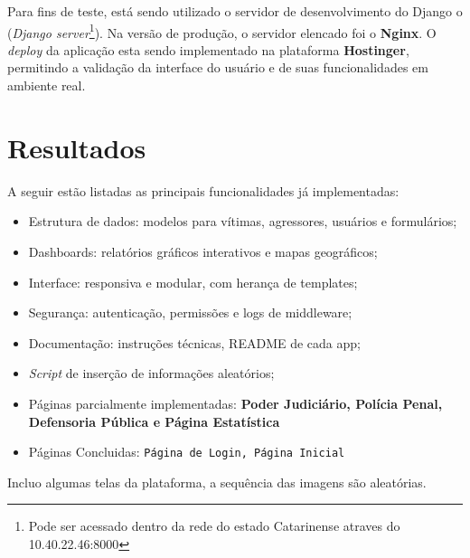 \par Para fins de teste, está sendo utilizado o servidor de desenvolvimento do Django o (\textit{Django server}\footnote{Pode ser acessado dentro da rede do estado Catarinense atraves do 10.40.22.46:8000}). Na versão de produção, o servidor elencado foi o \textbf{Nginx}. O \textit{deploy} da aplicação esta sendo implementado na plataforma \textbf{Hostinger}, permitindo a validação da interface do usuário e de suas funcionalidades em ambiente real.

\section{Resultados}

A seguir estão listadas as principais funcionalidades já implementadas:

\begin{itemize}
    \item Estrutura de dados: modelos para vítimas, agressores, usuários e formulários;
    \item Dashboards: relatórios gráficos interativos e mapas geográficos;
    \item Interface: responsiva e modular, com herança de templates;
    \item Segurança: autenticação, permissões e logs de middleware;
    \item Documentação: instruções técnicas, README de cada app;
    \item \textit{Script} de inserção de informações aleatórios;
    \item Páginas parcialmente implementadas: \textbf{Poder Judiciário, Polícia Penal, Defensoria Pública e Página Estatística}
    \item Páginas Concluidas: \texttt{Página de Login, Página Inicial}
\end{itemize}

\par Incluo algumas telas da plataforma, a sequência das imagens são aleatórias.

